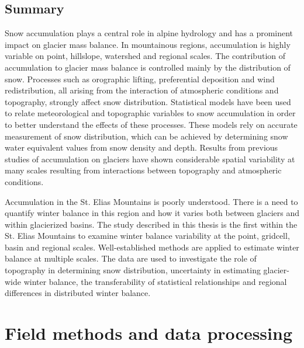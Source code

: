 \documentclass{sfuthesis}
\begin{document}
\section{Summary}
Snow accumulation plays a central role in alpine hydrology and has a prominent impact on glacier mass balance. In mountainous regions, accumulation is highly variable on point, hillslope, watershed and regional scales. The contribution of accumulation to glacier mass balance is controlled mainly by the distribution of snow. Processes such as orographic lifting, preferential deposition and wind redistribution, all arising from the interaction of atmospheric conditions and topography, strongly affect snow distribution. Statistical models have been used to relate meteorological and topographic variables to snow accumulation in order to better understand the effects of these processes. These models rely on accurate measurement of snow distribution, which can be achieved by determining snow water equivalent values from snow density and depth. Results from previous studies of accumulation on glaciers have shown considerable spatial variability at many scales resulting from interactions between topography and atmospheric conditions. 

Accumulation in the St. Elias Mountains is poorly understood. There is a need to quantify winter balance in this region and how it varies both between glaciers and within glacierized basins. The study described in this thesis is the first within the St. Elias Mountains to examine winter balance variability at the point, gridcell, basin and regional scales. Well-established methods are applied to estimate winter balance at multiple scales. The data are used to investigate the role of topography in determining snow distribution, uncertainty in estimating glacier-wide winter balance, the transferability of statistical relationships and regional differences in distributed winter balance. 



\chapter{Field methods and data processing}
\end{document}
